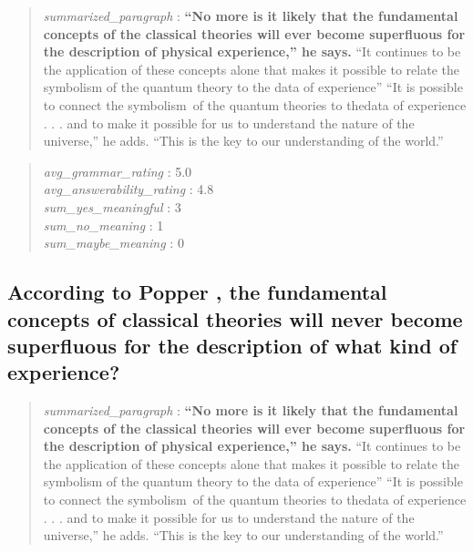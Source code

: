 \begin{quote}
\emph{summarized\_paragraph} : \textbf{``No more is it likely that the
fundamental concepts of the classical theories will ever become
superfluous for the description of physical experience,'' he says.} ``It
continues to be the application of these concepts alone that makes it
possible to relate the symbolism of the quantum theory to the data of
experience'' ``It is possible to connect the symbolism~of the quantum
theories to thedata of experience . . . and to make it possible for us
to understand the nature of the universe,'' he adds. ``This is the key
to our understanding of the world.''
\end{quote}

\begin{quote}
\emph{avg\_grammar\_rating} : 5.0\\
\emph{avg\_answerability\_rating} : 4.8\\
\emph{sum\_yes\_meaningful} : 3\\
\emph{sum\_no\_meaning} : 1\\
\emph{sum\_maybe\_meaning} : 0
\end{quote}

\hypertarget{according-to-popper-the-fundamental-concepts-of-classical-theories-will-never-become-superfluous-for-the-description-of-what-kind-of-experience}{%
\subsection{According to Popper , the fundamental concepts of classical
theories will never become superfluous for the description of what kind
of
experience?}\label{according-to-popper-the-fundamental-concepts-of-classical-theories-will-never-become-superfluous-for-the-description-of-what-kind-of-experience}}

\begin{quote}
\emph{summarized\_paragraph} : \textbf{``No more is it likely that the
fundamental concepts of the classical theories will ever become
superfluous for the description of physical experience,'' he says.} ``It
continues to be the application of these concepts alone that makes it
possible to relate the symbolism of the quantum theory to the data of
experience'' ``It is possible to connect the symbolism~of the quantum
theories to thedata of experience . . . and to make it possible for us
to understand the nature of the universe,'' he adds. ``This is the key
to our understanding of the world.''
\end{quote}

